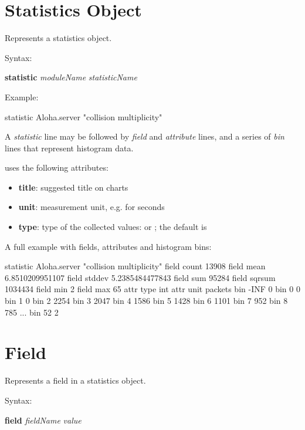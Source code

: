 \section{Statistics Object}
\label{sec:result-file-formats:statistics-object}

Represents a statistics object.

Syntax:

\hspace{20mm} \textbf{statistic} \textit{moduleName} \textit{statisticName}

Example:

\begin{filelisting}
statistic Aloha.server 	"collision multiplicity"
\end{filelisting}

A \textit{statistic} line may be followed by \textit{field} and \textit{attribute} lines,
and a series of \textit{bin} lines that represent histogram data.

{\opp} uses the following attributes:

\begin{itemize}
    \item \textbf{title}: suggested title on charts
    \item \textbf{unit}: measurement unit, e.g.  for seconds
    \item \textbf{type}: type of the collected values:  or ;
                         the default is 
\end{itemize}

A full example with fields, attributes and histogram bins:

\begin{filelisting}
statistic Aloha.server 	"collision multiplicity"
field count 13908
field mean 6.8510209951107
field stddev 5.2385484477843
field sum 95284
field sqrsum 1034434
field min 2
field max 65
attr type int
attr unit packets
bin	-INF	0
bin	0	0
bin	1	0
bin	2	2254
bin	3	2047
bin	4	1586
bin	5	1428
bin	6	1101
bin	7	952
bin	8	785
...
bin	52	2
\end{filelisting}


\section{Field}
\label{sec:result-file-formats:field}

Represents a field in a statistics object.

Syntax:

\hspace{20mm} \textbf{field} \textit{fieldName} \textit{value}

